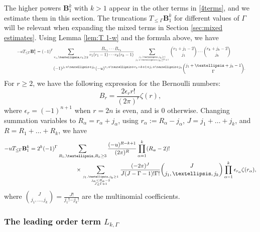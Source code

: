 \documentclass[12pt]{amsart}
\theoremstyle{definition}
\numberwithin{equation}{section}
\newcommand{\bB}{\mathbf{B}}
\theoremstyle{definition} %
\theoremstyle{remark}
\begin{document}
The higher powers $\bB_1^k$ with $k > 1$ appear in the other terms in \eqref{4terms}, and we estimate them in this section. The truncations $T_{\leq \Gamma}\bB_1^k$ for different values of $\Gamma$ will be relevant when expanding the mixed terms in Section \ref{sec:mixed estimates}.
Using Lemma \ref{lem:T 1-w} and the formula above, we have
\[
\resizebox{.95\hsize}{!}{
$\begin{aligned}
-u T_{\leq \Gamma} \bB_1^k &= 
(-1)^\Gamma \sum_{r_1,\dots,r_k\geq 2}
\frac{B_{r_1}\cdots B_{r_k}}{r_1(r_1-1)\cdots r_k(r_k-1)}
\sum_{j_1,\dots,j_k\geq 1 \atop j_1+\dots+j_k\geq \Gamma+1}
\binom{r_1+j_1-2}{j_1}\cdots \binom{r_k+j_k-2}{j_k}
\\&\quad\quad\quad\quad
(-1)^{j_1+\dots+j_k}
(-u)^{r_1+\dots+r_k-k+1+j_1+\dots+j_k}
\binom{j_1+\dots+j_k-1}{\Gamma}.
\end{aligned}$}
\]
For $r\geq 2$, we have the following expression for the Bernoulli numbers:
\[
B_r = \frac{2\epsilon_r r!}{(2\pi)^r}\zeta(r),
\]
where $\epsilon_r = (-1)^{n+1}$ when $r = 2n$ is even, and is $0$ otherwise. Changing summation variables to $R_\alpha=r_\alpha+j_\alpha$, using $r_\alpha:=R_\alpha-j_\alpha$, $J=j_1+\dots+j_k$, and $R=R_1+\dots+R_k$, we have
\begin{align}\label{equ:preB1k}
    -u T_{\leq \Gamma} \bB_1^k &= 
    2^k(-1)^\Gamma
    \sum_{R_1,\dots,R_k\geq 3}
    \frac{(-u)^{R-k+1}}{(2\pi)^{R}}\prod_{\alpha=1}^k(R_\alpha-2)! \\  &\qquad \qquad \qquad \qquad \times \sum_{j_1,\dots,j_k\geq 1\atop { j_\alpha\leq R_\alpha-2
    \atop J\geq \Gamma+1}}
    \frac{(-2\pi)^J}{J (J-\Gamma-1)! \Gamma!}
    \binom{J}{j_1,\dots,j_k} 
    \prod_{\alpha=1}^k\epsilon_{r_\alpha}\zeta(r_\alpha), \notag
\end{align}
where 
$
    \binom{J}{j_1,\dots,j_k} = \frac{J!}{j_1!\cdots j_k!}
$
are the multinomial coefficients.

\subsubsection{The leading order term $L_{k,\Gamma}$} \label{sec:lt}
\end{document}
